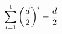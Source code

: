 \documentclass[preview]{standalone}
\begin{document}
\begin{align*}
\sum_{i=1}^{ 1 } \left({ d } \over {2} \right)^i = { { d } \over { 2 } }
\end{align*}
\end{document}
